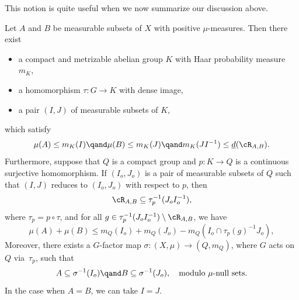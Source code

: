 This notion is quite useful when we now summarize our discussion above.

\begin{proposition}
\label{mainprop}
Let $A$ and $B$ be measurable subsets of $X$ with positive $\mu$-measures. Then there exist

\begin{itemize}
\item a compact and metrizable abelian group $K$ with Haar probability measure $m_K$,
\item a homomorphism $\tau : G \to K$ with dense image,
\item a pair $(I,J)$ of measurable subsets of $K$,
\end{itemize}

which satisfy
\[
\mu(A) \leq m_K(I) \qand \mu(B) \leq m_K(J) \qand m_K(JI^{-1}) \leq \underline{d}(\cR_{A,B}).
\]
Furthermore, suppose that $Q$ is a compact group and $p : K \to Q$ is a continuous surjective homomorphism.
If $(I_o,J_o)$ is a pair of measurable subsets of $Q$ such that $(I,J)$ reduces to $(I_o,J_o)$ with respect to $p$,
then
\[
\cR_{A,B} \subseteq \tau_p^{-1}(J_o I_o^{-1}),
\]
where $\tau_p = p \circ \tau$, and for all $g \in \tau_p^{-1}(J_oI_o^{-1}) \setminus \cR_{A,B}$, we have
\[
\mu(A) + \mu(B) \leq m_Q(I_o) + m_Q(J_o) - m_Q(I_o \cap \tau_p(g)^{-1}J_o),
\]
Moreover, there exists a $G$-factor map $\sigma : (X,\mu) \to (Q,m_Q)$, where $G$ acts on $Q$ via~$\tau_p$, such that
\[
A \subseteq \sigma^{-1}(I_o) \qand B \subseteq \sigma^{-1}(J_o), \quad \textrm{modulo $\mu$-null sets}.
\]
In the case when $A = B$, we can take $I = J$.
\end{proposition}

